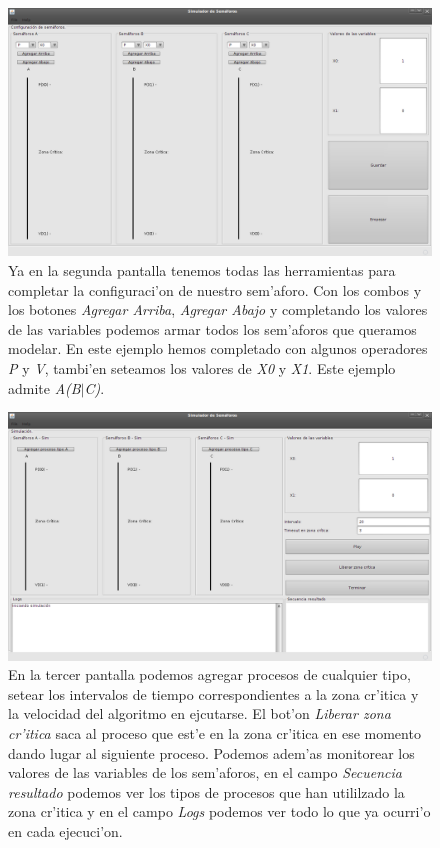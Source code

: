 \begin{figure}
\centering
 \includegraphics[scale=0.4,keepaspectratio=true]{./imagenes/semaforo/semaforos2.png}
 \caption{Ya en la segunda pantalla tenemos todas las herramientas para completar la configuraci'on de nuestro sem'aforo. Con los combos y los botones \emph{Agregar Arriba}, \emph{Agregar Abajo} y completando los valores de las variables podemos armar todos los sem'aforos que queramos modelar. En este ejemplo hemos completado con algunos operadores \emph{P} y \emph{V}, tambi'en seteamos los valores de \emph{X0} y \emph{X1}. Este ejemplo admite \emph{A(B}$|$\emph{C)}.}
\end{figure}

\begin{figure}
\centering
 \includegraphics[scale=0.4,keepaspectratio=true]{./imagenes/semaforo/semaforos3.png}
 \caption{En la tercer pantalla podemos agregar procesos de cualquier tipo, setear los intervalos de tiempo correspondientes a la zona cr'itica y la velocidad del algoritmo en ejcutarse. El bot'on \emph{Liberar zona cr'itica} saca al proceso que est'e en la zona cr'itica en ese momento dando lugar al siguiente proceso. Podemos adem'as monitorear los valores de las variables de los sem'aforos, en el campo \emph{Secuencia resultado} podemos ver los tipos de procesos que han utililzado la zona cr'itica y en el campo \emph{Logs} podemos ver todo lo que ya ocurri'o en cada ejecuci'on.}
\end{figure}

